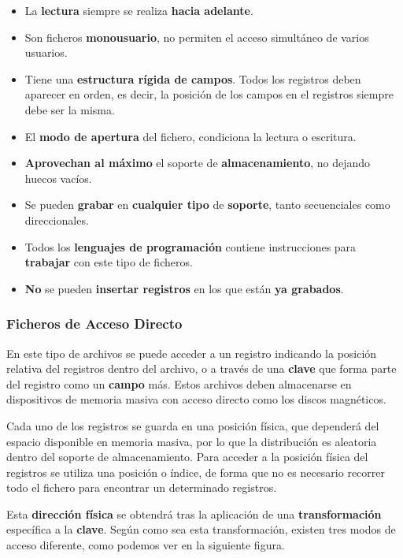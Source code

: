\begin{itemize}
    \item La \textbf{lectura} siempre se realiza \textbf{hacia adelante}.
    \item Son ficheros \textbf{monousuario}, no permiten el acceso simultáneo de varios usuarios.
    \item Tiene una \textbf{estructura rígida de campos}. Todos los registros deben aparecer en orden, es decir, la posición de los campos en el registros siempre debe ser la misma.
    \item El \textbf{modo de apertura} del fichero, condiciona la lectura o escritura.
    \item \textbf{Aprovechan al máximo} el soporte de \textbf{almacenamiento}, no dejando huecos vacíos.
    \item Se pueden \textbf{grabar} en \textbf{cualquier tipo} de \textbf{soporte}, tanto secuenciales como direccionales.
    \item Todos los \textbf{lenguajes de programación} contiene instrucciones para \textbf{trabajar} con este tipo de ficheros.
    \item \textbf{No} se pueden \textbf{insertar registros} en los que están \textbf{ya grabados}.
\end{itemize}

\subsubsection{Ficheros de Acceso Directo}
En este tipo de archivos se puede acceder a un registro indicando la posición relativa del registros dentro del archivo, o a través de una \textbf{clave} que forma parte del registro como un \textbf{campo} más. Estos archivos deben almacenarse en dispositivos de memoria masiva con acceso directo como los discos magnéticos.

Cada uno de los registros se guarda en una posición física, que dependerá del espacio disponible en memoria masiva, por lo que la distribución es aleatoria dentro del soporte de almacenamiento. Para acceder a la posición física del registros se utiliza una posición o índice, de forma que no es necesario recorrer todo el fichero para encontrar un determinado registros.

 Esta \textbf{dirección física} se obtendrá tras la aplicación de una \textbf{transformación} específica a la \textbf{clave}. Según como sea esta transformación, existen tres modos de acceso diferente, como podemos ver en la siguiente figura.

